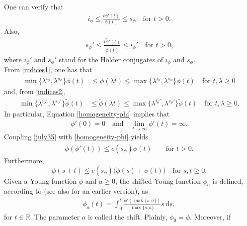 \documentclass[leqno,11pt]{amsart}%
\numberwithin{equation}{section}
\def\R{\mathbb R}
\def\d{\mathrm{d}}
\theoremstyle{definition}
\numberwithin{equation}{section}
\begin{document}
One can verify that
\begin{align}
    \label{indices1}
    i_\phi\leq    \frac{t\phi'(t)}{\phi(t)}  \leq  s_\phi \quad \text{for $t >0$.}
\end{align}
 Also, 
\begin{align}
    \label{indices2}
    s_\phi '\leq    \frac{t{\widetilde \phi}'(t)}{\widetilde \phi(t)}  \leq  i_\phi ' \quad \text{for $t >0$,}
\end{align}
where $i_\phi'$ and $s_\phi'$ stand for the H\"older conjugates of $i_\phi$
and $s_\phi$.
\\ From \eqref{indices1}, one has that
 \begin{align}
   \min\{ \lambda^{i_\phi}, \lambda^{s_\phi}\} \phi(t)
    &\le \phi(\lambda t)
      \le\max\{ \lambda^{i_\phi}, \lambda^{s_\phi}\}\phi(t) \quad \text{for $t, \lambda \geq 0$}
      \label{homogeneity-phi}
      \end{align}
      and, from \eqref{indices2},
      \begin{align}
      \min\{ \lambda^{i_\phi'}, \lambda^{s_\phi'}\}\widetilde \phi(t)
    &\le \widetilde \phi(\lambda t)
      \le \max\{ \lambda^{i_\phi'}, \lambda^{s_\phi'}\}\widetilde \phi(t) \quad \text{for $t, \lambda \geq 0$.}
      \label{homogeneity-phi-star}
  \end{align}
  In particular, Equation \eqref{homogeneity-phi} implies that
  \begin{align}
      \label{july57}
      \phi'(0)=0 \quad \text{and} \quad \lim_{t\to \infty}\phi'(t)=\infty.
  \end{align}
  Coupling \eqref{july35} with \eqref{homogeneity-phi} yields
  \begin{align}
    \label{july59}
    \widetilde\phi (\phi'(t))
  \le
   c(s_\phi)\phi(t) \qquad
  \text{for $t>0$.}
\end{align}
  Furthermore,
\begin{equation}\label{july36}
    \phi(s+t)\le c(s_\phi)\big(\phi(s)+\phi(t)\big) \quad \text{for $s,t \geq 0$.}
\end{equation}
Given a Young function $\phi$ and $a\geq 0$, the shifted Young function $\phi_a$ is defined, according to \cite{DieForTomWan19} (see also \cite{DieEtt08} for an earlier version), as 
\begin{align}
  \phi_a(t) = \int_0^t \frac{\phi'(\max \{ s,  {a}  \})}{\max \{ s, {a} \}} s \, \d s,
\end{align}
 for $t \in
\R$. The parameter $a$ is called
the shift.  Plainly, $\phi_0= \phi$. Moreover, if
\end{document}
